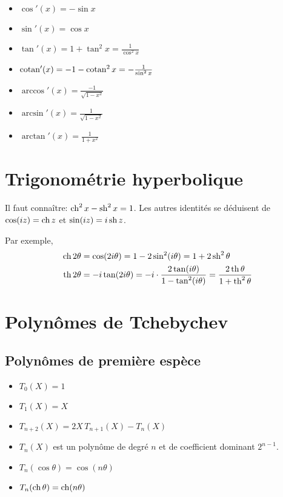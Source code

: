 \documentclass{yann}
\newcommand\I{i}
\begin{document}
\begin{itemize}
\item
$\cos'(x)    = -\sin x$
\item
$\sin'(x)    = \cos x$
\item
$\tan'(x)    = 1 + \tan^2 x = \frac{1}{\cos^2 x}$
\item
$\operatorname{cotan}'(x)  = -1 - \operatorname{cotan}^2 x = -\frac{1}{\sin^2 x}$
\item
$\arccos'(x) = \frac{-1}{\sqrt{1-x^2}}$
\item
$\arcsin'(x) = \frac{1}{\sqrt{1-x^2}}$
\item
$\arctan'(x) = \frac{1}{1+x^2}$
\end{itemize}

\section{Trigonométrie hyperbolique}

Il faut connaître: $\operatorname{ch}^2 x - \operatorname{sh}^2 x = 1$.
Les autres identités se déduisent de
$\cos(\I z) = \ch z$ et $\sin(\I z) = \I \sh z$.

Par exemple,
\[ \begin{aligned} \ch 2\theta &= \cos(2\I\theta)
  = 1 - 2\sin^2(\I\theta)
  = 1 + 2\sh^2\theta \\
 \th 2\theta &= -\I\tan(2\I\theta)
  = -\I\cdot\frac{2\tan(\I\theta)}{1 - \tan^2(\I\theta)}
  = \frac{2\th\theta}{1 + \th^2\theta}
  \end{aligned} \]

\section{Polynômes de Tchebychev}

\subsection{Polynômes de première espèce}

\begin{itemize}
\item
$T_0(X)      = 1$
\item
$T_1(X)      = X$
\item
$T_{n+2}(X)  = 2X \, T_{n+1}(X) - T_n(X)$
\item
$T_n(X)$ est un polynôme de degré $n$ et de coefficient dominant $2^{n-1}$.
\item
$T_n(\cos\theta)  = \cos(n\theta)$
\item
$T_n(\operatorname{ch}\theta) = \operatorname{ch}(n\theta)$
\end{itemize}
\end{document}
